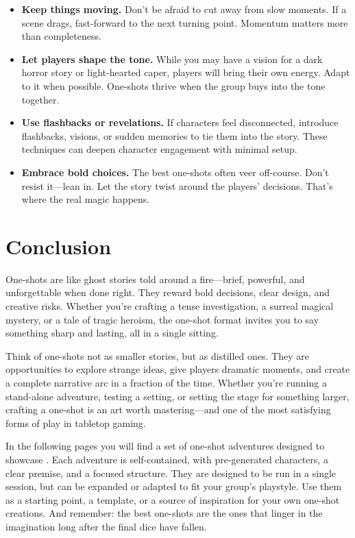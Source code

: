 \begin{itemize}
    \item \textbf{Keep things moving.} Don’t be afraid to cut away from slow moments. If a scene drags, fast-forward to the next turning point. Momentum matters more than completeness.
    
    \item \textbf{Let players shape the tone.} While you may have a vision for a dark horror story or light-hearted caper, players will bring their own energy. Adapt to it when possible. One-shots thrive when the group buys into the tone together.
    
    \item \textbf{Use flashbacks or revelations.} If characters feel disconnected, introduce flashbacks, visions, or sudden memories to tie them into the story. These techniques can deepen character engagement with minimal setup.
    
    \item \textbf{Embrace bold choices.} The best one-shots often veer off-course. Don’t resist it—lean in. Let the story twist around the players' decisions. That’s where the real magic happens.
\end{itemize}

\section{Conclusion}

One-shots are like ghost stories told around a fire—brief, powerful, and unforgettable when done right. They reward bold decisions, clear design, and creative risks. Whether you're crafting a tense investigation, a surreal magical mystery, or a tale of tragic heroism, the one-shot format invites you to say something sharp and lasting, all in a single sitting.

Think of one-shots not as smaller stories, but as distilled ones. They are opportunities to explore strange ideas, give players dramatic moments, and create a complete narrative arc in a fraction of the time. Whether you’re running a stand-alone adventure, testing a setting, or setting the stage for something larger, crafting a one-shot is an art worth mastering—and one of the most satisfying forms of play in tabletop gaming.

In the following pages you will find a set of one-shot adventures designed to showcase \wyrd. Each adventure is self-contained, with pre-generated characters, a clear premise, and a focused structure. They are designed to be run in a single session, but can be expanded or adapted to fit your group’s playstyle. Use them as a starting point, a template, or a source of inspiration for your own one-shot creations. And remember: the best one-shots are the ones that linger in the imagination long after the final dice have fallen.